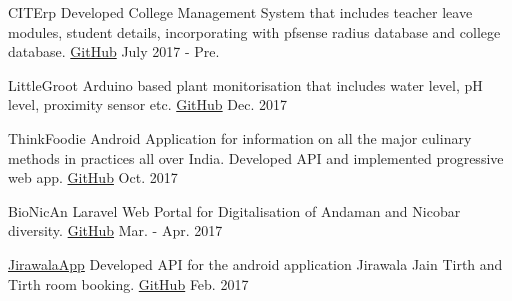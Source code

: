 



\begin{cvhonors}

  \cvhonor
	{CITErp} %
	{Developed College Management System that includes teacher leave modules, student details, incorporating with pfsense radius database and college database.} %
	{\href{https://github.com/CITABU/citabu_erp}{GitHub}} %
	{July 2017 - Pre.} %

  \cvhonor
	{LittleGroot} %
	{Arduino based plant monitorisation that includes water level, pH level, proximity sensor etc.} %
	{\href{https://github.com/vijaypurohit/little_groot}{GitHub}} %
	{Dec. 2017} %
	
  \cvhonor
	{ThinkFoodie} %
	{Android Application for information on all the major culinary methods in practices all over India. Developed API and implemented progressive web app.} %
	{\href{https://github.com/vijaypurohit/thinkFoodie}{GitHub}} %
	{Oct. 2017} %
    
  \cvhonor
	 {BioNicAn} %
	 {Laravel Web Portal for Digitalisation of Andaman and Nicobar diversity.} %
	 {\href{https://github.com/vijaypurohit/Bionican}{GitHub}} %
	 {Mar. - Apr. 2017} %
	 
  \cvhonor
    {\href{https://play.google.com/store/apps/details?id=org.jirawalajaintirth.jirawalajaintirth&hl=en}{JirawalaApp}} %
    {Developed API for the android application Jirawala Jain Tirth and Tirth room booking.} %
    {\href{https://github.com/vijaypurohit/jirawalaApp_api}{GitHub}} %
    {Feb. 2017} %
    

\end{cvhonors}
